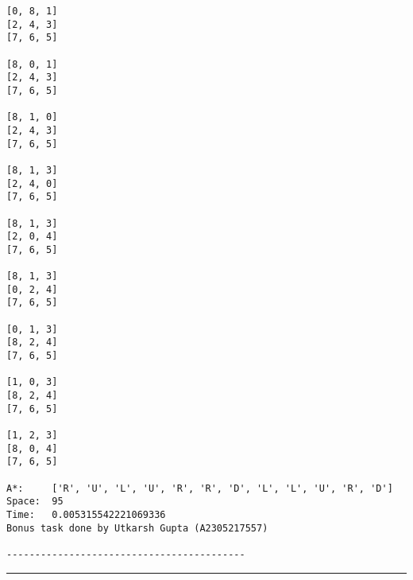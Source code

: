 \documentclass[11pt]{article}
\begin{document}
\begin{Verbatim}[commandchars=\\\{\}]
[0, 8, 1]
[2, 4, 3]
[7, 6, 5]

[8, 0, 1]
[2, 4, 3]
[7, 6, 5]

[8, 1, 0]
[2, 4, 3]
[7, 6, 5]

[8, 1, 3]
[2, 4, 0]
[7, 6, 5]

[8, 1, 3]
[2, 0, 4]
[7, 6, 5]

[8, 1, 3]
[0, 2, 4]
[7, 6, 5]

[0, 1, 3]
[8, 2, 4]
[7, 6, 5]

[1, 0, 3]
[8, 2, 4]
[7, 6, 5]

[1, 2, 3]
[8, 0, 4]
[7, 6, 5]

A*:     ['R', 'U', 'L', 'U', 'R', 'R', 'D', 'L', 'L', 'U', 'R', 'D']
Space:  95
Time:   0.005315542221069336
Bonus task done by Utkarsh Gupta (A2305217557)

------------------------------------------
    \end{Verbatim}

    \noindent\rule{16.5cm}{0.4pt}
\end{document}

